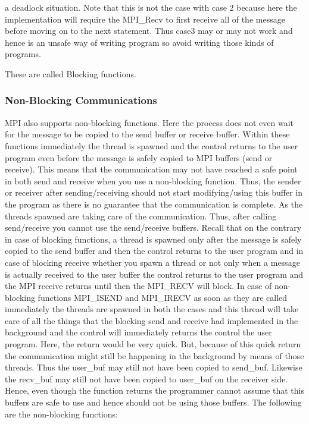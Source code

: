\documentclass[12pt]{article}
\begin{document}
a deadlock situation. Note that this is not the case with case 2 because here the implementation will require the MPI\_Recv to first receive all of the message before moving on to the next statement. Thus case3 may or may not work and hence is an unsafe way of writing program so avoid writing those kinds of programs.

These are called Blocking functions.

\subsubsection{Non-Blocking Communications}
MPI also supports non-blocking functions. Here the process does not even wait for the message to be copied to the send buffer or receive buffer. Within these functions immediately the thread is spawned and the control returns to the user program even before the message is safely copied to MPI buffers (send or receive). This means that the communication may not have reached a safe point in both send and receive when you use a non-blocking function. Thus, the sender or receiver after sending/receiving should not start modifying/using this buffer in the program as there is no guarantee that the communication is complete. As the threads spawned are taking care of the communication. Thus, after calling send/receive you cannot use the send/receive buffers. Recall that on the contrary in case of blocking functions, a thread is spawned only after the message is safely copied to the send buffer and then the control returns to the user program and in case of blocking receive whether you spawn a thread or not only when a message is actually received to the user buffer the control returns to the user program and the MPI receive returns until then the MPI\_RECV will block. In case of non-blocking functions MPI\_ISEND and MPI\_IRECV as soon as they are called immediately the threads are spawned in both the cases and this thread will take care of all the things that the blocking send and receive had implemented in the background and the control will immediately returns the control the user program. Here, the return would be very quick. But, because of this quick return the communication might still be happening in the background by means of those threads. Thus the user\_buf may still not have been copied to send\_buf. Likewise the recv\_buf may still not have been copied to user\_buf on the receiver side. Hence, even though the function returns the programmer cannot assume that this buffers are safe to use and hence should not be using those buffers. The following are the non-blocking functions:
\end{document}

